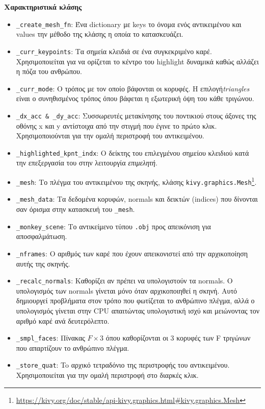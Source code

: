 \noindent\textbf{Χαρακτηριστικά κλάσης}
\begin{itemize}
	\item \texttt{\_create\_mesh\_fn}: Ένα dictionary με keys το όνομα ενός αντικειμένου και values την μέθοδο της κλάσης η οποία το κατασκευάζει.
	\item \texttt{\_curr\_keypoints}: Τα σημεία κλειδιά σε ένα συγκεκριμένο καρέ. Χρησιμοποιείται για να ορίζεται το κέντρο του highlight δυναμικά καθώς αλλάζει η πόζα του ανθρώπου.
	\item \texttt{\_curr\_mode}: Ο τρόπος με τον οποίο βάφονται οι κορυφές. Η επιλογή\textsl{triangles} είναι ο συνηθισμένος τρόπος όπου βάφεται η εξωτερική όψη του κάθε τριγώνου.
	\item \texttt{\_dx\_acc \& \_dy\_acc}: Συσσωρευτές μετακίνησης του ποντικιού στους άξονες της οθόνης x και y αντίστοιχα από την στιγμή που έγινε το πρώτο κλικ. Χρησιμοποιούνται για την ομαλή περιστροφή του αντικειμένου.
	\item \texttt{\_highlighted\_kpnt\_indx}: Ο δείκτης του επιλεγμένου σημείου κλειδιού κατά την επεξεργασία του στην λειτουργία \textsl{επιμελητή}.
	\item \texttt{\_mesh}: Το πλέγμα του αντικειμένου της σκηνής, κλάσης \texttt{kivy.graphics.Mesh}\footnote{\href{https://kivy.org/doc/stable/api-kivy.graphics.html\#kivy.graphics.Mesh}{https://kivy.org/doc/stable/api-kivy.graphics.html\#kivy.graphics.Mesh}}.
	\item \texttt{\_mesh\_data}: Τα δεδομένα κορυφών, normals και δεικτών (indices) που δίνονται σαν όρισμα στην κατασκευή του \texttt{\_mesh}.
	\item \texttt{\_monkey\_scene}: Το αντικείμενο τύπου \texttt{.obj} προς απεικόνιση για αποσφαλμάτωση.
	\item \texttt{\_nframes}: Ο αριθμός των καρέ που έχουν απεικονιστεί από την αρχικοποίηση αυτής της σκηνής.
	\item \texttt{\_recalc\_normals}: Καθορίζει αν πρέπει να υπολογιστούν τα normals. Ο υπολογισμός των normals γίνεται μόνο όταν αρχικοποιηθεί η σκηνή. Αυτό δημιουργεί προβλήματα στον τρόπο που φωτίζεται το ανθρώπινο πλέγμα, αλλά ο υπολογισμός γίνεται στην CPU απαιτώντας υπολογιστική ισχύ και μειώνοντας τον αριθμό καρέ ανά δευτερόλεπτο.
	\item \texttt{\_smpl\_faces}: Πίνακας $F \times 3$ όπου καθορίζονται οι 3 κορυφές των F τριγώνων που απαρτίζουν το ανθρώπινο πλέγμα.
	\item \texttt{\_store\_quat}: To αρχικό τετραδόνιο της περιστροφής του αντικειμένου. Χρησιμοποιείται για την ομαλή περιστροφή στο διαρκές κλικ.

\end{itemize}
